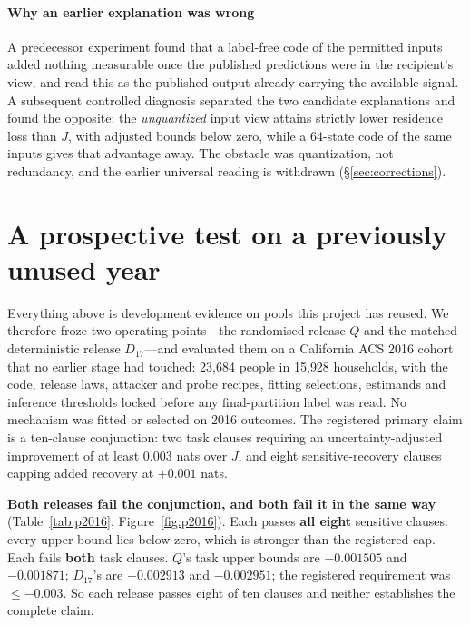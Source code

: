 \documentclass[conference]{IEEEtran}
\begin{document}
\paragraph{Why an earlier explanation was wrong} A predecessor experiment found that a label-free code of
the permitted inputs added nothing measurable once the published predictions were in the recipient's view,
and read this as the published output already carrying the available signal. A subsequent controlled
diagnosis separated the two candidate explanations and found the opposite: the \emph{unquantized} input
view attains strictly lower residence loss than $J$, with adjusted bounds below zero, while a $64$-state
code of the same inputs gives that advantage away. The obstacle was quantization, not redundancy, and the
earlier universal reading is withdrawn (\S\ref{sec:corrections}).

\section{A prospective test on a previously unused year}
\label{sec:prospective}

Everything above is development evidence on pools this project has reused. We therefore froze two
operating points---the randomised release $Q$ and the matched deterministic release $D_{17}$---and
evaluated them on a California ACS 2016 cohort that no earlier stage had touched: 23{,}684 people in
15{,}928 households, with the code, release laws, attacker and probe recipes, fitting selections,
estimands and inference thresholds locked before any final-partition label was read. No mechanism was
fitted or selected on 2016 outcomes. The registered primary claim is a ten-clause conjunction: two task
clauses requiring an uncertainty-adjusted improvement of at least $0.003$ nats over $J$, and eight
sensitive-recovery clauses capping added recovery at $+0.001$ nats.

\textbf{Both releases fail the conjunction, and both fail it in the same way} (Table~\ref{tab:p2016},
Figure~\ref{fig:p2016}). Each passes \textbf{all eight} sensitive clauses: every upper bound lies below
zero, which is stronger than the registered cap. Each fails \textbf{both} task clauses. $Q$'s task upper
bounds are $-0.001505$ and $-0.001871$; $D_{17}$'s are $-0.002913$ and $-0.002951$; the registered
requirement was $\le-0.003$. So each release passes eight of ten clauses and neither establishes the
complete claim.
\end{document}
